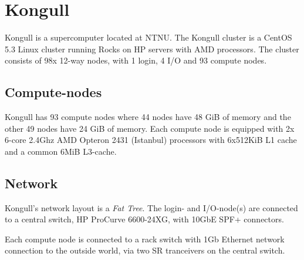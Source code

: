 \section{Kongull} %
\label{sec:appendix_kongull}
Kongull is a supercomputer located at NTNU. The Kongull cluster is a CentOS 5.3 Linux cluster running Rocks on HP servers with AMD processors. The cluster consists of 98x 12-way nodes, with 1 login, 4 I/O and 93 compute nodes.

\subsection{Compute-nodes} %
\label{sub:compute_nodes}
Kongull has 93 compute nodes where 44 nodes have 48 GiB of memory and the other 49 nodes have 24 GiB of memory. Each compute node is equipped with 2x 6-core 2.4Ghz AMD Opteron 2431 (Istanbul) processors with 6x512KiB L1 cache and a common 6MiB L3-cache.

\subsection{Network} %
\label{sub:network}
Kongull's network layout is a \emph{Fat Tree}. The login- and I/O-node(s) are connected to a central switch, HP ProCurve 6600-24XG, with 10GbE SPF+ connectors.

Each compute node is connected to a rack switch with 1Gb Ethernet network connection to the outside world, via two SR tranceivers on the central switch.


